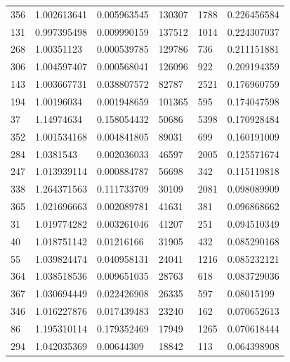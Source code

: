 \documentclass{cumcmthesis}
\begin{document}
\begin{description}
\begin{longtable}{l|llll|l}
356                         & 1.002613641 & 0.005963545 & 130307 & 1788  & 0.226456584 \\
131                         & 0.997395498 & 0.009990159 & 137512 & 1014  & 0.224307037 \\
268                         & 1.00351123  & 0.000539785 & 129786 & 736   & 0.211151881 \\
306                         & 1.004597407 & 0.000568041 & 126096 & 922   & 0.209194359 \\
143                         & 1.003667731 & 0.038807572 & 82787  & 2521  & 0.176960759 \\
194                         & 1.00196034  & 0.001948659 & 101365 & 595   & 0.174047598 \\
37                          & 1.14974634  & 0.158054432 & 50686  & 5398  & 0.170928484 \\
352                         & 1.001534168 & 0.004841805 & 89031  & 699   & 0.160191009 \\
284                         & 1.0381543   & 0.002036033 & 46597  & 2005  & 0.125571674 \\
247                         & 1.013939114 & 0.000884787 & 56698  & 342   & 0.115119818 \\
338                         & 1.264371563 & 0.111733709 & 30109  & 2081  & 0.098089909 \\
365                         & 1.021696663 & 0.002089781 & 41631  & 381   & 0.096868662 \\
31                          & 1.019774282 & 0.003261046 & 41207  & 251   & 0.094510349 \\
40                          & 1.018751142 & 0.01216166  & 31905  & 432   & 0.085290168 \\
55                          & 1.039824474 & 0.040958131 & 24041  & 1216  & 0.085232121 \\
364                         & 1.038518536 & 0.009651035 & 28763  & 618   & 0.083729036 \\
367                         & 1.030694449 & 0.022426908 & 26335  & 597   & 0.08015199  \\
346                         & 1.016227876 & 0.017439483 & 23240  & 162   & 0.070652613 \\
86                          & 1.195310114 & 0.179352469 & 17949  & 1265  & 0.070618444 \\
294                         & 1.042035369 & 0.00644309  & 18842  & 113   & 0.064398908 \\

\end{longtable}
\end{description}
\end{document}
